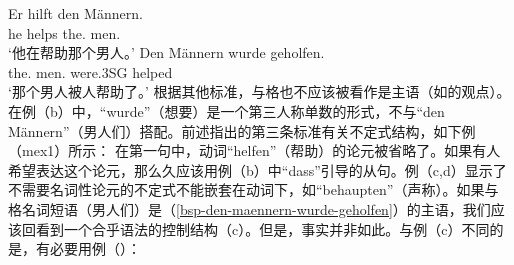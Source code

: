 \eal
\ex 
\gll Er hilft den Männern.\\
	 he helps the.\dat{} men.\dat{}\\
\glt `他在帮助那个男人。'
\ex
\label{bsp-den-maennern-wurde-geholfen}
\gll Den Männern wurde geholfen.\\
	 the.\dat{} men.\dat{} were.3SG helped\\
\glt `那个男人被人帮助了。'
\zl
根据其他标准，与格也不应该被看作是主语（如\citet{Reis82}的观点）。在例（b）中，“wurde”（想要）是一个第三人称单数的形式，不与“den Männern”（男人们）搭配。前述指出的第三条标准有关不定式结构，如下例（mex{1}）所示：
\eal
{}
\zl
%
在第一句中，动词“helfen”（帮助）的论元被省略了。如果有人希望表达这个论元，那么久应该用例（b）中“dass”引导的从句。例（c,d）显示了不需要名词性论元的不定式不能嵌套在动词下，如“behaupten”（声称）。如果与格名词短语（男人们）是（\ref{bsp-den-maennern-wurde-geholfen}）的主语，我们应该回看到一个合乎语法的控制结构（c）。但是，事实并非如此。与例（c）不同的是，有必要用例（）：
